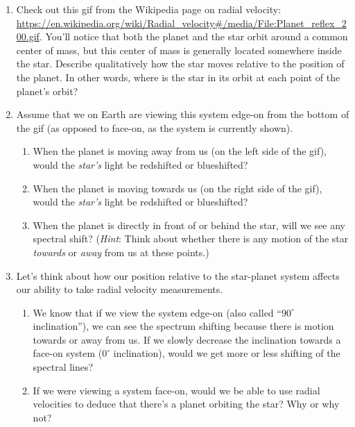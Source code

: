 \documentclass[11pt]{article}
\begin{document}
\begin{enumerate}[resume]
    \item Check out this gif from the Wikipedia page on radial velocity: \url{https://en.wikipedia.org/wiki/Radial_velocity#/media/File:Planet_reflex_200.gif}.  You'll notice that both the planet and the star orbit around a common center of mass, but this center of mass is generally located somewhere inside the star. Describe qualitatively how the star moves relative to the position of the planet. In other words, where is the star in its orbit at each point of the planet's orbit?
        
    \item Assume that we on Earth are viewing this system edge-on from the bottom of the gif (as opposed to face-on, as the system is currently shown).
        \begin{enumerate}
            \item When the planet is moving away from us (on the left side of the gif), would the \emph{star's} light be redshifted or blueshifted?
            
            \item When the planet is moving towards us (on the right side of the gif), would the \emph{star's} light be redshifted or blueshifted?
            
            \item When the planet is directly in front of or behind the star, will we see any spectral shift? (\textit{Hint}: Think about whether there is any motion of the star \textit{towards} or \textit{away} from us at these points.)
        \end{enumerate}
        
    \item Let's think about how our position relative to the star-planet system affects our ability to take radial velocity measurements.
        \begin{enumerate}
            \item We know that if we view the system edge-on (also called ``$90^\circ$ inclination''), we can see the spectrum shifting because there is motion towards or away from us. If we slowly decrease the inclination towards a face-on system ($0^\circ$ inclination), would we get more or less shifting of the spectral lines?
            
            \item If we were viewing a system face-on, would we be able to use radial velocities to deduce that there's a planet orbiting the star? Why or why not?
        \end{enumerate}
        

\end{enumerate}
\end{document}
